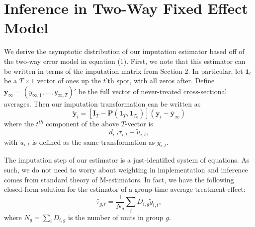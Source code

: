 \documentclass[12pt]{article}
\begin{document}
\section{Inference in Two-Way Fixed Effect Model}\label{sec:twfe_inference}

We derive the asymptotic distribution of our imputation estimator based off of the two-way error model in equation (1). First, we note that this estimator can be written in terms of the imputation matrix from Section 2. In particular, let $\bm 1_t$ be a $T \times 1$ vector of ones up the $t$'th spot, with all zeros after. Define $\overline{\bm y}_{\infty} = (\overline{y}_{\infty, 1},..., \overline{y}_{\infty, T})'$ be the full vector of never-treated cross-sectional averages. Then our imputation transformation can be written as 
\begin{equation}
    \tilde{\bm y}_i = \left[ \bm I_T - \bm P(\bm 1_T, \bm 1_{T_0}) \right] (\bm y_i - \overline{\bm y}_{\infty})
\end{equation}
where the $t^{th}$ component of the above $T$-vector is 
\begin{equation}
    d_{i,t} \tau_{i,t} + \tilde{u}_{i,t},
\end{equation}
with $\tilde{u}_{i,t}$ is defined as the same transformation as $\tilde{y}_{i,t}$.

The imputation step of our estimator is a just-identified system of equations. As such, we do not need to worry about weighting in implementation and inference comes from standard theory of M-estimators. In fact, we have the following closed-form solution for the estimator of a group-time average treatment effect: 
\begin{equation}
    \widehat{\tau}_{g,t} = \frac{1}{N_{g}}\sum_{i} D_{i,g} \tilde{y}_{i,t},
\end{equation}
where $N_{g} = \sum_i D_{i,g}$ is the number of units in group $g$. 
\end{document}
